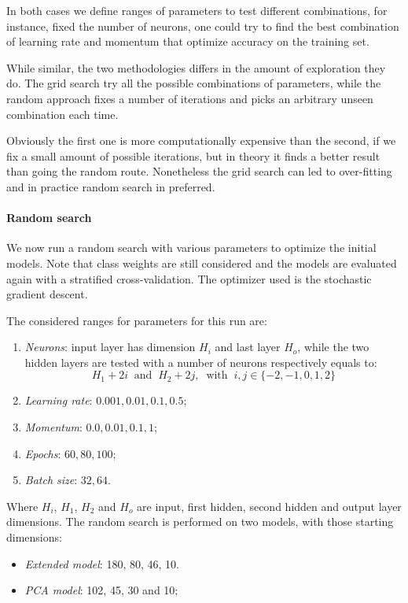 In both cases we define ranges of parameters to test different combinations, 
for instance, fixed the number of neurons, one could try to find the best 
combination of learning rate and momentum that optimize accuracy on the training set.

While similar, the two methodologies differs in the amount of exploration they do.
The grid search try all the possible combinations of parameters, while the 
random approach fixes a number of iterations and picks an arbitrary unseen 
combination each time. 

Obviously the first one is more computationally expensive than the second, if 
we fix a small amount of possible iterations, but in theory it finds a better result
than going the random route. 
Nonetheless the grid search can led to over-fitting and in practice random 
search in preferred.

\paragraph{Random search}
We now run a random search with various parameters 
to optimize the initial models.
Note that class weights are still considered and the models are evaluated
again with a stratified cross-validation.
The optimizer used is the stochastic gradient descent.

The considered ranges for parameters for this run are: 
\begin{enumerate}
    \item \emph{Neurons}: input layer has dimension $H_i$ and last layer $H_o$, while 
    the two hidden layers are tested with a number of neurons respectively 
    equals to: 
    $$H_1 + 2i\;\;\text{and}\;\;H_2 + 2j,\;\;\text{with}\;\; i, j \in \{-2,-1,0,1,2\}$$
    \item \emph{Learning rate}: $0.001, 0.01, 0.1, 0.5$;
    \item \emph{Momentum}: $0.0, 0.01, 0.1, 1$;
    \item \emph{Epochs}: $60, 80, 100$;
    \item \emph{Batch size}: $32, 64$.
\end{enumerate}

Where $H_i$, $H_1$, $H_2$ and $H_o$ are input, first hidden, second hidden 
and output layer dimensions.
The random search is performed on two models, with those starting dimensions: 
\begin{itemize}
    \item \emph{Extended model}: 180, 80, 46, 10.
    \item \emph{PCA model}: 102, 45, 30 and 10;
\end{itemize}


